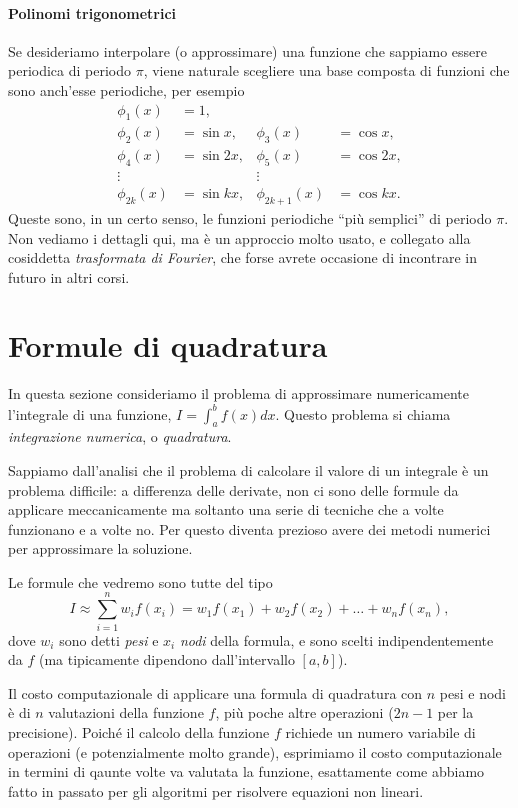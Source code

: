 \documentclass[a4paper]{report}
\theoremstyle{definiton}
\theoremstyle{remark}
\begin{document}
\paragraph{Polinomi trigonometrici} Se desideriamo interpolare (o approssimare) una funzione che sappiamo essere periodica di periodo $\pi$, viene naturale scegliere una base composta di funzioni che sono anch'esse periodiche, per esempio
\begin{align*}
\phi_1(x) &= 1,\\
\phi_2(x) &= \sin x, & \phi_3(x) &= \cos x,\\
\phi_4(x) &= \sin 2x, & \phi_5(x) &= \cos 2x,\\
\vdots & & \vdots &\\
\phi_{2k}(x) &= \sin kx, & \phi_{2k+1}(x) &= \cos kx.
\end{align*}
Queste sono, in un certo senso, le funzioni periodiche ``più semplici'' di periodo $\pi$. Non vediamo i dettagli qui, ma è un approccio molto usato, e collegato alla cosiddetta \emph{trasformata di Fourier}, che forse avrete occasione di incontrare in futuro in altri corsi.

\section{Formule di quadratura}

In questa sezione consideriamo il problema di approssimare numericamente l'integrale di una funzione, $I = \int_a^b f(x) dx$. Questo problema si chiama \emph{integrazione numerica}, o \emph{quadratura}.

Sappiamo dall'analisi che il problema di calcolare il valore di un integrale è un problema difficile: a differenza delle derivate, non ci sono delle formule da applicare meccanicamente ma soltanto una serie di tecniche che a volte funzionano e a volte no. Per questo diventa prezioso avere dei metodi numerici per approssimare la soluzione.

Le formule che vedremo sono tutte del tipo
\[
I \approx \sum_{i=1}^n w_i f(x_i) = w_1 f(x_1) + w_2 f(x_2) + \dots + w_n f(x_n),
\]
dove $w_i$ sono detti \emph{pesi} e $x_i$ \emph{nodi} della formula, e sono scelti indipendentemente da $f$ (ma tipicamente dipendono dall'intervallo $[a,b]$).

Il costo computazionale di applicare una formula di quadratura con $n$ pesi e nodi è di $n$ valutazioni della funzione $f$, più poche altre operazioni ($2n-1$ per la precisione). Poiché il calcolo della funzione $f$ richiede un numero variabile di operazioni (e potenzialmente molto grande), esprimiamo il costo computazionale in termini di qaunte volte va valutata la funzione, esattamente come abbiamo fatto in passato per gli algoritmi per risolvere equazioni non lineari.
\end{document}

